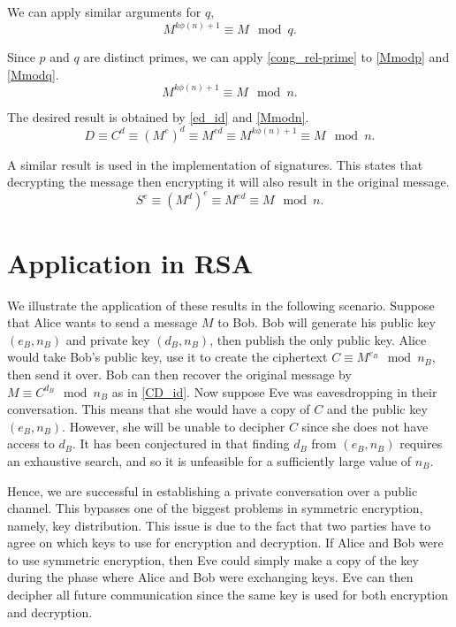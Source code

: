 \documentclass[10pt]{article}
\begin{document}
\noindent We can apply similar arguments for $q$,
\begin{equation}
    \label{Mmodq}
    M^{k \phi(n) + 1} \equiv M \mod q.
\end{equation}

\noindent Since $p$ and $q$ are distinct primes, we can apply \ref{cong_rel-prime} to \ref{Mmodp} and \ref{Mmodq}.
\begin{equation}
    \label{Mmodn}
    M^{k \phi(n) + 1} \equiv M \mod n.
\end{equation}

\noindent The desired result is obtained by \ref{ed_id} and \ref{Mmodn}.
\begin{equation}
    \label{CD_id}
    D \equiv C^d \equiv (M^e)^d  \equiv M^{e d} \equiv M^{k \phi(n) + 1} \equiv M \mod n.
\end{equation}

\noindent A similar result is used in the implementation of signatures. This states that decrypting the message then encrypting it will also result in the original message.
\begin{equation}
    \label{SE_id}
    S^e \equiv (M^d)^e \equiv M^{e d} \equiv M \mod n.
\end{equation}


\section{Application in RSA}
We illustrate the application of these results in the following scenario. Suppose that Alice wants to send a message $M$ to Bob. Bob will generate his public key $(e_B, n_B)$ and private key $(d_B, n_B)$, then publish the only public key. Alice would take Bob’s public key, use it to create the ciphertext $C \equiv M^{e_B} \mod n_B$, then send it over. Bob can then recover the original message by $M \equiv C^{d_B} \mod n_B$ as in \ref{CD_id}. Now suppose Eve was eavesdropping in their conversation. This means that she would have a copy of $C$ and the public key $(e_B, n_B)$. However, she will be unable to decipher $C$ since she does not have access to $d_B$. It has been conjectured in \cite{rivest1978method} that finding $d_B$ from $(e_B, n_B)$ requires an exhaustive search, and so it is unfeasible for a sufficiently large value of $n_B$.

Hence, we are successful in establishing a private conversation over a public channel. This bypasses one of the biggest problems in symmetric encryption, namely, key distribution. This issue is due to the fact that two parties have to agree on which keys to use for encryption and decryption. If Alice and Bob were to use symmetric encryption, then Eve could simply make a copy of the key during the phase where Alice and Bob were exchanging keys. Eve can then decipher all future communication since the same key is used for both encryption and decryption.
\end{document}
